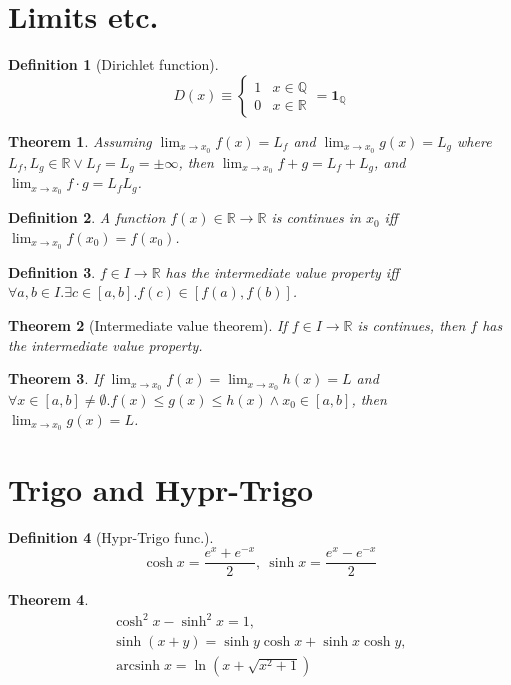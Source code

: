\documentclass[]{article}
\newtheorem{theorem}{Theorem}[section]
\newtheorem{definition}{Definition}[section]
\newcommand\R     {\mathbb{R}}
\newcommand\Q     {\mathbb{Q}}
\newcommand\sinhx {\sinh x}
\newcommand\coshx {\cosh x}
\DeclareMathOperator{\arcsinh}{arcsinh}
\newcommand\limxz {\lim_{x \to x_0}}
\renewcommand\inf {\infty}
\begin{document}
\begin{multicols}{2}
		\section{Limits etc.}
		\begin{definition}[Dirichlet function]
			\[ D(x) \equiv \begin{cases}
				1 & x \in \Q \\
				0 & x \in \R
			\end{cases} = \mathbf{1}_\Q \]
		\end{definition}
		\begin{theorem}
			Assuming $\limxz f(x) = L_f $ and $\limxz g(x) = L_g$ where $L_f, L_g \in \R \lor L_f = L_g = \pm\inf$, then $\limxz f + g = L_f + L_g$, and $\limxz f \cdot g = L_fL_g$. 
		\end{theorem}
		\begin{definition}
			A function $f(x) \in \R \to \R$ is continues in $x_0$ iff $\limxz f(x_0) = f(x_0)$. 
		\end{definition}
		\begin{definition}
			$f \in I \to \R$ has the intermediate value property iff $\forall a, b \in I. \exists c \in [a, b]. f(c) \in [f(a), f(b)]$. 
		\end{definition}
		\begin{theorem}[Intermediate value theorem]
			If $f \in I \to \R$ is continues, then $f$ has the intermediate value property. 
		\end{theorem}
		\begin{theorem}
			If $\limxz f(x) = \limxz h(x) = L$ and $\forall x \in [a, b] \neq \emptyset. f(x) \le g(x) \le h(x) \land x_0 \in [a, b]$, then $\limxz g(x) = L$. 
		\end{theorem}
		\section{Trigo and Hypr-Trigo}
		\begin{definition}[Hypr-Trigo func.]
			\[ \coshx = \frac{e^x + e^{-x}}{2}, \ \sinhx = \frac{e^x - e^{-x}}{2} \]
		\end{definition}
		\begin{theorem}
			\begin{gather*}
				\cosh^2x - \sinh^2x = 1, \\
				\sinh(x + y) = \sinh y \coshx + \sinhx \cosh y, \\ 
				\arcsinh x = \ln(x + \sqrt{x^2 + 1})
			\end{gather*}
		\end{theorem}

\end{multicols}
\end{document}
